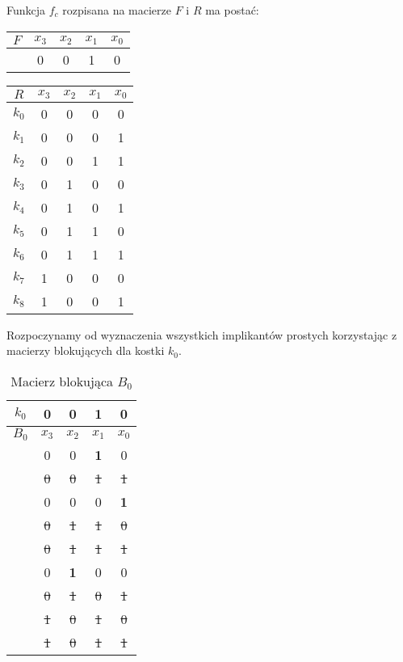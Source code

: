 \setcounter{implicant_counter}{0}

Funkcja $f_c$ rozpisana na macierze $F$ i $R$ ma postać:
\begin{center}
    \begin{tabular}[t]{ |c|c c c c|}
        \hline
        $F$ & $x_3$ & $x_2$ & $x_1$ & $x_0$ \\
        \hline
        & 0 & 0 & 1 & 0 \\
        \hline
    \end{tabular}
    \hspace{1cm}
    \begin{tabular}[t]{ |c|c c c c| }
        \hline
        $R$ & $x_3$ & $x_2$ & $x_1$ & $x_0$ \\
        \hline
        $k_0$ & 0 & 0 & 0 & 0 \\
        $k_1$ & 0 & 0 & 0 & 1 \\
        $k_2$ & 0 & 0 & 1 & 1 \\
        $k_3$ & 0 & 1 & 0 & 0 \\
        $k_4$ & 0 & 1 & 0 & 1 \\
        $k_5$ & 0 & 1 & 1 & 0 \\
        $k_6$ & 0 & 1 & 1 & 1 \\
        $k_7$ & 1 & 0 & 0 & 0 \\
        $k_8$ & 1 & 0 & 0 & 1 \\
        \hline
    \end{tabular}
\end{center}

Rozpoczynamy od wyznaczenia wszystkich implikantów prostych korzystając z macierzy blokujących dla kostki
$k_0$.

\begin{table}[H]
    \centering
    \begin{tabular}[t]{ |c|c c c c| }
        \hline
        $k_0$ & 0 & 0 & 1 & 0 \\
        \hline\hline
        $B_0$ & $x_3$ & $x_2$ & $x_1$ & $x_0$ \\
        \hline
        & 0 & 0 & \textbf{1} & 0 \\
        & \sout{0} & \sout{0} & \sout{1} & \sout{1} \\
        & 0 & 0 & 0 & \textbf{1} \\
        & \sout{0} & \sout{1} & \sout{1} & \sout{0} \\
        & \sout{0} & \sout{1} & \sout{1} & \sout{1} \\
        & 0 & \textbf{1} & 0 & 0 \\
        & \sout{0} & \sout{1} & \sout{0} & \sout{1} \\
        & \sout{1} & \sout{0} & \sout{1} & \sout{0} \\
        & \sout{1} & \sout{0} & \sout{1} & \sout{1} \\
        \hline
    \end{tabular}
    \caption{Macierz blokująca $B_0$} \label{tab:b0c}
\end{table}

